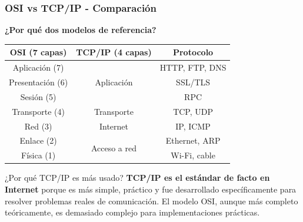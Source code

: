 \documentclass[aspectratio=169]{beamer}
\begin{document}
\begin{frame}
\frametitle{OSI vs TCP/IP - Comparación}

\begin{center}
\Large \textbf{¿Por qué dos modelos de referencia?}
\end{center}

\begin{center}
\begin{table}
\centering
\begin{tabular}{|c|c|c|}
\hline
\textbf{OSI (7 capas)} & \textbf{TCP/IP (4 capas)} & \textbf{Protocolo} \\
\hline
\rowcolor{lightBlue} Aplicación (7) & \multirow{3}{*}{Aplicación} & HTTP, FTP, DNS \\
\rowcolor{lightBlue} Presentación (6) & & SSL/TLS \\
\rowcolor{lightBlue} Sesión (5) & & RPC \\
\rowcolor{lightOrange} Transporte (4) & Transporte & TCP, UDP \\
\rowcolor{lightBlue} Red (3) & Internet & IP, ICMP \\
\rowcolor{lightOrange} Enlace (2) & \multirow{2}{*}{Acceso a red} & Ethernet, ARP \\
\rowcolor{lightOrange} Física (1) & & Wi-Fi, cable \\
\hline
\end{tabular}
\end{table}
\end{center}

\begin{block}{¿Por qué TCP/IP es más usado?}
\textbf{TCP/IP es el estándar de facto en Internet} porque es más simple, 
práctico y fue desarrollado específicamente para resolver problemas reales 
de comunicación. El modelo OSI, aunque más completo teóricamente, es 
demasiado complejo para implementaciones prácticas.
\end{block}
\end{frame}
\end{document}
